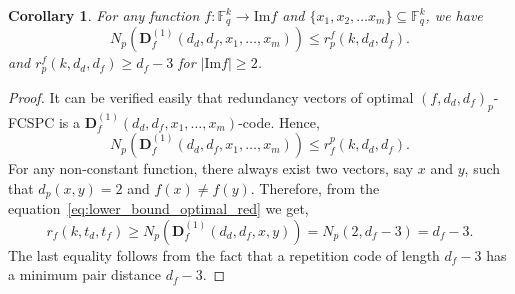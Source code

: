 \documentclass[11pt,draftclsnofoot,journal,onecolumn]{IEEEtran}
\newtheorem{theorem}{Theorem}
\newtheorem{corollary}{Corollary}
\newcommand{\Img}{\mathrm{Im}}
\begin{document}
     \begin{corollary}
         For any function $f: \mathbb{F}_q^k \rightarrow \Img{f}$ and $\{x_1, x_2, \ldots x_m\} \subseteq \mathbb{F}_q^k$, we have 
         \[
            N_p(\boldsymbol{D}_f^{(1)}(d_d, d_f, x_1, \dots, x_{m})) \leq r_p^f(k, d_d, d_f).
         \]
         and $ r_p^f(k,d_d,d_f) \geq d_f - 3 $ for $|\Img{f}| \geq 2$.   
     \end{corollary}

    \begin{proof}
        It can be verified easily that redundancy vectors of optimal $(f, d_d, d_f)_p$-FCSPC is a $\boldsymbol{D}_f^{(1)}(d_d, d_f, x_1, \dots, x_{m})$-code. Hence,
        \begin{equation}
        \label{eq:lower_bound_optimal_red}
            N_p(\boldsymbol{D}_f^{(1)}(d_d, d_f, x_1, \dots, x_{m})) \leq r_f^p(k, d_d, d_f).
        \end{equation}
        For any non-constant function, there always exist two vectors, say $x$ and $y$, such that $d_p(x,y) = 2$ and $f(x) \neq f(y)$. Therefore, from the equation~\ref{eq:lower_bound_optimal_red} we get,
        \[
            r_f(k,t_d,t_f) \geq N_p(\boldsymbol{D}_f^{(1)}(d_d, d_f, x,y)) = N_p(2, d_f - 3) = d_f - 3.
        \]
        The last equality follows from the fact that a repetition code of length $d_f - 3$ has a minimum pair distance $d_f - 3$.
    \end{proof}




\end{document}
